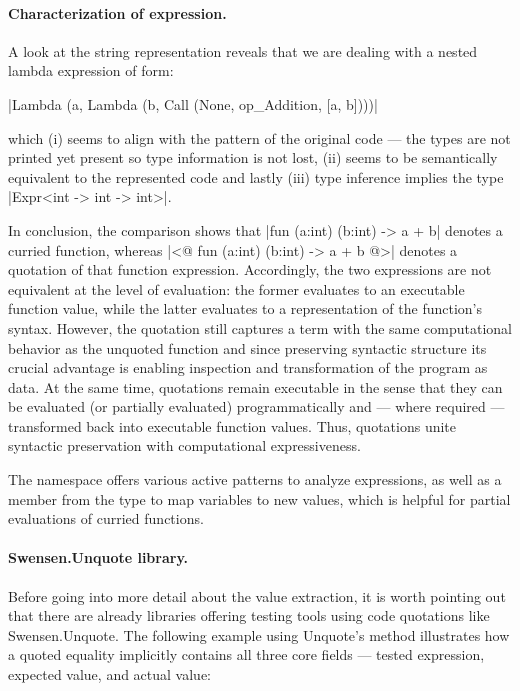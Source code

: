 \paragraph{Characterization of expression.}%
\label{par:characterization-the-expression} A look at the string representation
reveals that we are dealing with a nested lambda expression of form:

\begin{center}\fsharp|Lambda (a, Lambda (b, Call (None, op_Addition, [a,
b])))|\end{center}

\noindent which (i) seems to align with the pattern of the original code --- the
types are not printed yet present so type information is not lost, (ii) seems to
be semantically equivalent to the represented code and lastly (iii) type inference
implies the type \fsharp|Expr<int -> int -> int>|.

\skipL In conclusion, the comparison shows that \fsharp|fun (a:int) (b:int) -> a
+ b| denotes a curried function, whereas \fsharp|<@ fun (a:int) (b:int) -> a + b
@>| denotes a quotation of that function expression. Accordingly, the two
expressions are not equivalent at the level of \fs evaluation: the former
evaluates to an executable function value, while the latter evaluates to a
representation of the function's syntax. However, the quotation still captures a
term with the same computational behavior as the unquoted function and since
preserving syntactic structure its crucial advantage is enabling inspection and
transformation of the program as data. At the same time, quotations remain
executable in the sense that they can be evaluated (or partially evaluated)
programmatically and --- where required --- transformed back into executable
function values. Thus, quotations unite syntactic preservation with
computational expressiveness.

\skipM The  namespace offers various active
patterns to analyze expressions, as well as a member  from
the  type to map variables to new values, which is helpful for
partial evaluations of curried functions.


\paragraph{Swensen.Unquote library.}
    \label{Swensen.Unquote}
Before going into more detail about the value extraction, it is worth
pointing out that there are already libraries offering testing tools using code
quotations like Swensen.Unquote. \cite{SwenUnq} The following example using
Unquote's  method illustrates how a quoted equality implicitly
contains all three core fields --- tested expression, expected value, and actual
value:

